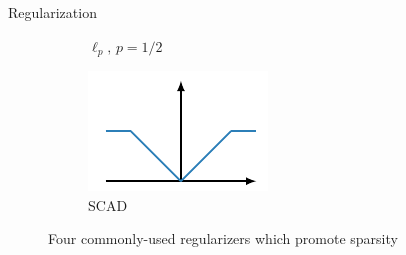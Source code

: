 \documentclass[8pt]{beamer}
\begin{document}
\begin{frame}{Regularization}
\begin{figure}
\begin{subfigure}[b]{0.25\textwidth}
         \caption{$\ell_p,\, p=1/2$}
     \end{subfigure}%
     \begin{subfigure}[b]{0.25\textwidth}
         \centering
         \includegraphics[width=\textwidth]{Figures/scad_regularizer.pdf}
         \caption{SCAD}
     \end{subfigure}
     \caption{Four commonly-used regularizers which promote sparsity}
     \label{fig:three graphs}
\end{figure}

\end{frame}
\end{document}
